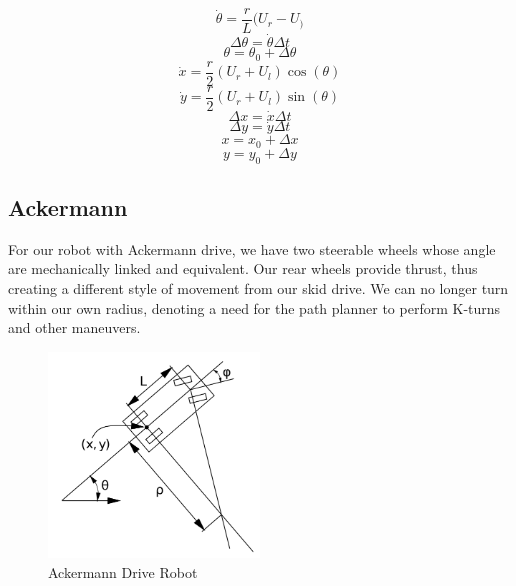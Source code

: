 \documentclass{article}
\begin{document}
\begin{equation}
    \dot{\theta} = \frac{r}{L}(U_r - U_)
\end{equation}
\begin{equation}
    \Delta \theta = \dot{\theta} \Delta t
\end{equation}
\begin{equation}
    \theta = \theta_0 + \Delta \theta
\end{equation}
\begin{equation}
    \dot{x} = \frac{r}{2}(U_r + U_l)\cos(\theta)
\end{equation}
\begin{equation}
    \dot{y} = \frac{r}{2}(U_r + U_l)\sin(\theta)
\end{equation}
\begin{equation}
    \Delta x = \dot{x} \Delta t
\end{equation}
\begin{equation}
    \Delta y = \dot{y} \Delta t
\end{equation}
\begin{equation}
    x = x_0 + \Delta x
\end{equation}
\begin{equation}
    y = y_0 + \Delta y
\end{equation}

\subsection*{Ackermann}

For our robot with Ackermann drive, we have two steerable wheels whose angle are mechanically linked and equivalent. Our rear wheels provide thrust, thus creating a different style of movement from our skid drive. We can no longer turn within our own radius, denoting a need for the path planner to perform K-turns and other maneuvers.

\begin{figure}[H]
    \centering
    \includegraphics[width = 0.5\textwidth]{imgs/ackermann.png}
    \caption{Ackermann Drive Robot}
    \label{fig:ackermann-drive}
\end{figure}
\end{document}
